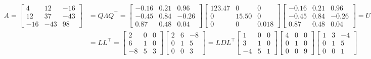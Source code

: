\documentclass[13pt]{article}
\theoremstyle{definition}
\theoremstyle{remark}
\begin{document}
\begin{align*}
    A = \begin{bmatrix}
4 & 12 & -16 \\
12 & 37 & -43 \\
-16 & -43 & 98
    \end{bmatrix} &= Q\Lambda Q^\top =\begin{bmatrix}
        -0.16 & 0.21 & 0.96 \\
-0.45 & 0.84 & -0.26 \\
0.87 & 0.48 & 0.04
    \end{bmatrix}
    \begin{bmatrix}
        123.47 & 0 & 0 \\
0 & 15.50 & 0 \\
0 & 0 & 0.018
    \end{bmatrix}
    \begin{bmatrix}
        -0.16 & 0.21 & 0.96 \\
-0.45 & 0.84 & -0.26 \\
0.87 & 0.48 & 0.04
    \end{bmatrix} = U\Sigma V^\top\\
    &=LL^\top =  \begin{bmatrix}
        2 & 0 & 0 \\
6 & 1 & 0 \\
-8 & 5 & 3
    \end{bmatrix}
    \begin{bmatrix}
        2 & 6 & -8 \\
0 & 1 & 5 \\
0 & 0 & 3
    \end{bmatrix}=LDL^\top \begin{bmatrix}
        1 & 0 & 0 \\
3 & 1 & 0 \\
-4 & 5 & 1
    \end{bmatrix}
    \begin{bmatrix}
        4 & 0 & 0 \\
0 & 1 & 0 \\
0 & 0 & 9
    \end{bmatrix}
    \begin{bmatrix}
        1 & 3 & -4 \\
0 & 1 & 5 \\
0 & 0 & 1
    \end{bmatrix}
\end{align*}

\headrule

\end{document}
